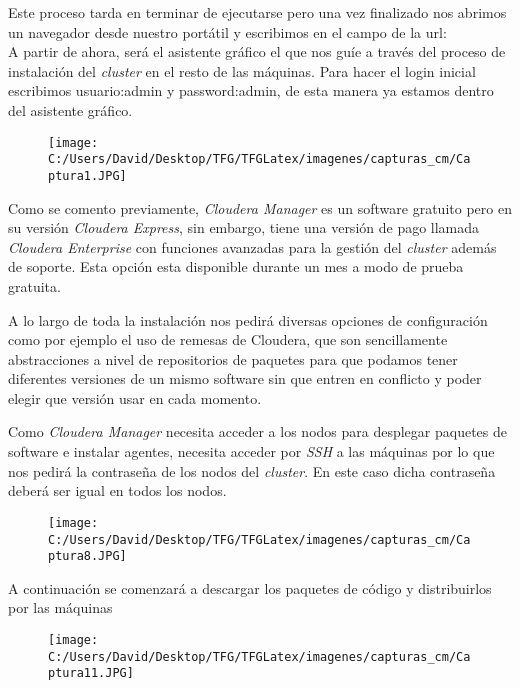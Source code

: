 Este proceso tarda en terminar de ejecutarse pero una vez finalizado nos abrimos un navegador desde nuestro
portátil y escribimos en el campo de la url: \\
A partir de ahora, será el asistente gráfico el que nos guíe a través del proceso de instalación del
\textit{cluster} en el resto de las máquinas. Para hacer el login inicial escribimos usuario:admin y 
password:admin, de esta manera ya estamos dentro del asistente gráfico.

\begin{figure}[!htpb]
  \centering
  \texttt{[image: C:/Users/David/Desktop/TFG/TFGLatex/imagenes/capturas\_cm/Captura1.JPG]}
\end{figure}

Como se comento previamente, \textit{Cloudera Manager} es un software gratuito pero en su versión \textit{Cloudera Express},
sin embargo, tiene una versión de pago llamada \textit{Cloudera Enterprise} con funciones avanzadas para la gestión del
\textit{cluster} además de soporte. Esta opción esta disponible durante un mes a modo de prueba gratuita.
\newline

A lo largo de toda la instalación nos pedirá diversas opciones de configuración como por ejemplo el uso de
remesas de Cloudera, que son sencillamente abstracciones a nivel de repositorios de paquetes para que
podamos tener diferentes versiones de un mismo software sin que entren en conflicto y poder elegir que
versión usar en cada momento.
\newline

Como \textit{Cloudera Manager} necesita acceder a los nodos para desplegar paquetes de software e instalar agentes, necesita
acceder por \textit{SSH} a las máquinas por lo que nos pedirá la contraseña de los nodos del \textit{cluster}.
En este caso dicha contraseña deberá ser igual en todos los nodos.

\clearpage

\begin{figure}[!htpb]
  \centering
  \texttt{[image: C:/Users/David/Desktop/TFG/TFGLatex/imagenes/capturas\_cm/Captura8.JPG]}
\end{figure}

A continuación se comenzará a descargar los paquetes de código y distribuirlos por las máquinas

\begin{figure}[!htpb]
  \centering
  \texttt{[image: C:/Users/David/Desktop/TFG/TFGLatex/imagenes/capturas\_cm/Captura11.JPG]}
\end{figure}

